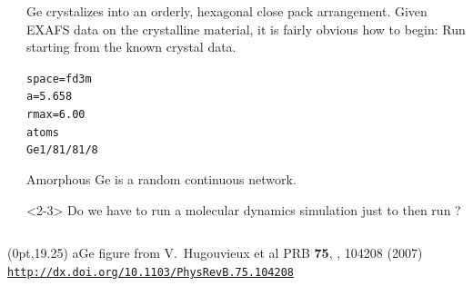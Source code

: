 \documentclass[10pt, xcolor=x11names, compress]{beamer}
\begin{document}
\begin{frame}[fragile]
\begin{columns}
\begin{column}{0.30\linewidth}
    \end{column}
    \begin{column}{0.7\linewidth}
      Ge crystalizes into an orderly, hexagonal close pack
      arrangement.  Given EXAFS data on the crystalline material, it
      is fairly obvious how to begin: Run {\feff} starting from the
      known crystal data.
      \begin{center}
        \begin{minipage}{0.5\linewidth}
\begin{alltt}
\scriptsize
{\color{SteelBlue2}space} = f d 3 m
{\color{Purple2}a}     = 5.658
{\color{Purple2}rmax}  = 6.00
{\color{Brown4}atoms}
  Ge   1/8   1/8   1/8
\end{alltt}
        \end{minipage}
      \end{center}
      Amorphous Ge is a random continuous network.  

      \medskip

      \begin{alertblock}<2-3>{}
        Do we have to run a molecular dynamics simulation just to
        then run {\feff}?

        \smallskip

      \end{alertblock}
    \end{column}
  \end{columns}

  \begin{textblock*}{0.5\linewidth}(0pt,19.25\TPVertModule)
    \tiny%
    aGe figure from
    V.\ Hugouvieux et al PRB \textbf{75}, , 104208 (2007)
    \href{http://dx.doi.org/10.1103/PhysRevB.75.104208}
    {\color{Blue2}\texttt{http://dx.doi.org/10.1103/PhysRevB.75.104208}}
  \end{textblock*}

\end{frame}
\end{document}
